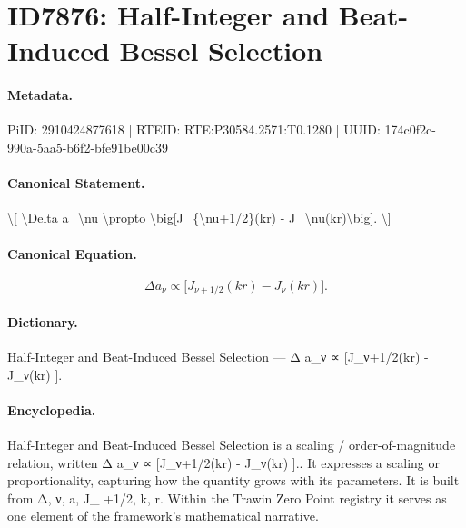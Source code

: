 \section*{ID7876: Half-Integer and Beat-Induced Bessel Selection}
\paragraph{Metadata.}
PiID: 2910424877618 | RTEID: RTE:P30584.2571:T0.1280 | UUID: 174c0f2c-990a-5aa5-b6f2-bfe91be00c39

\paragraph{Canonical Statement.}
\textbackslash{}[ \textbackslash{}Delta a\_\textbackslash{}nu \textbackslash{}propto \textbackslash{}big[J\_\{\textbackslash{}nu+1/2\}(kr) - J\_\textbackslash{}nu(kr)\textbackslash{}big]. \textbackslash{}]

\paragraph{Canonical Equation.}
\[
\Delta a_\nu \propto \big[J_{\nu+1/2}(kr) - J_\nu(kr)\big].
\]

\paragraph{Dictionary.}
Half-Integer and Beat-Induced Bessel Selection — Δ a\_ν ∝ [J\_ν+1/2(kr) - J\_ν(kr) ].

\paragraph{Encyclopedia.}
Half-Integer and Beat-Induced Bessel Selection is a scaling / order-of-magnitude relation, written Δ a\_ν ∝ [J\_ν+1/2(kr) - J\_ν(kr) ].. It expresses a scaling or proportionality, capturing how the quantity grows with its parameters. It is built from Δ, ν, a, J\_ +1/2, k, r. Within the Trawin Zero Point registry it serves as one element of the framework's mathematical narrative.

